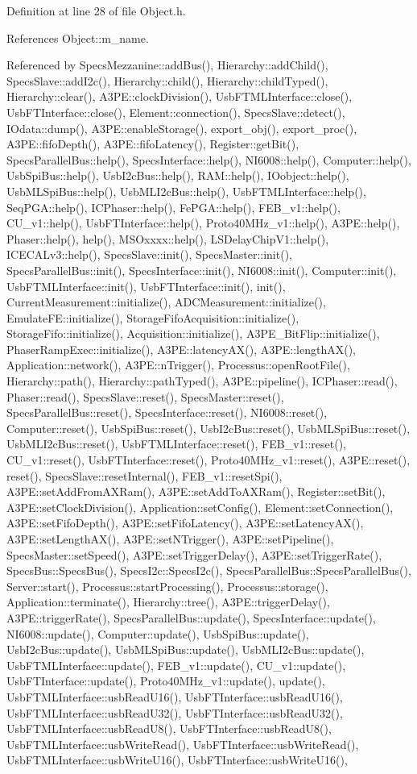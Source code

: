 Definition at line 28 of file Object.h.

References Object::m\_\-name.

Referenced by SpecsMezzanine::addBus(), Hierarchy::addChild(), SpecsSlave::addI2c(), Hierarchy::child(), Hierarchy::childTyped(), Hierarchy::clear(), A3PE::clockDivision(), UsbFTMLInterface::close(), UsbFTInterface::close(), Element::connection(), SpecsSlave::detect(), IOdata::dump(), A3PE::enableStorage(), export\_\-obj(), export\_\-proc(), A3PE::fifoDepth(), A3PE::fifoLatency(), Register::getBit(), SpecsParallelBus::help(), SpecsInterface::help(), NI6008::help(), Computer::help(), UsbSpiBus::help(), UsbI2cBus::help(), RAM::help(), IOobject::help(), UsbMLSpiBus::help(), UsbMLI2cBus::help(), UsbFTMLInterface::help(), SeqPGA::help(), ICPhaser::help(), FePGA::help(), FEB\_\-v1::help(), CU\_\-v1::help(), UsbFTInterface::help(), Proto40MHz\_\-v1::help(), A3PE::help(), Phaser::help(), help(), MSOxxxx::help(), LSDelayChipV1::help(), ICECALv3::help(), SpecsSlave::init(), SpecsMaster::init(), SpecsParallelBus::init(), SpecsInterface::init(), NI6008::init(), Computer::init(), UsbFTMLInterface::init(), UsbFTInterface::init(), init(), CurrentMeasurement::initialize(), ADCMeasurement::initialize(), EmulateFE::initialize(), StorageFifoAcquisition::initialize(), StorageFifo::initialize(), Acquisition::initialize(), A3PE\_\-BitFlip::initialize(), PhaserRampExec::initialize(), A3PE::latencyAX(), A3PE::lengthAX(), Application::network(), A3PE::nTrigger(), Processus::openRootFile(), Hierarchy::path(), Hierarchy::pathTyped(), A3PE::pipeline(), ICPhaser::read(), Phaser::read(), SpecsSlave::reset(), SpecsMaster::reset(), SpecsParallelBus::reset(), SpecsInterface::reset(), NI6008::reset(), Computer::reset(), UsbSpiBus::reset(), UsbI2cBus::reset(), UsbMLSpiBus::reset(), UsbMLI2cBus::reset(), UsbFTMLInterface::reset(), FEB\_\-v1::reset(), CU\_\-v1::reset(), UsbFTInterface::reset(), Proto40MHz\_\-v1::reset(), A3PE::reset(), reset(), SpecsSlave::resetInternal(), FEB\_\-v1::resetSpi(), A3PE::setAddFromAXRam(), A3PE::setAddToAXRam(), Register::setBit(), A3PE::setClockDivision(), Application::setConfig(), Element::setConnection(), A3PE::setFifoDepth(), A3PE::setFifoLatency(), A3PE::setLatencyAX(), A3PE::setLengthAX(), A3PE::setNTrigger(), A3PE::setPipeline(), SpecsMaster::setSpeed(), A3PE::setTriggerDelay(), A3PE::setTriggerRate(), SpecsBus::SpecsBus(), SpecsI2c::SpecsI2c(), SpecsParallelBus::SpecsParallelBus(), Server::start(), Processus::startProcessing(), Processus::storage(), Application::terminate(), Hierarchy::tree(), A3PE::triggerDelay(), A3PE::triggerRate(), SpecsParallelBus::update(), SpecsInterface::update(), NI6008::update(), Computer::update(), UsbSpiBus::update(), UsbI2cBus::update(), UsbMLSpiBus::update(), UsbMLI2cBus::update(), UsbFTMLInterface::update(), FEB\_\-v1::update(), CU\_\-v1::update(), UsbFTInterface::update(), Proto40MHz\_\-v1::update(), update(), UsbFTMLInterface::usbReadU16(), UsbFTInterface::usbReadU16(), UsbFTMLInterface::usbReadU32(), UsbFTInterface::usbReadU32(), UsbFTMLInterface::usbReadU8(), UsbFTInterface::usbReadU8(), UsbFTMLInterface::usbWriteRead(), UsbFTInterface::usbWriteRead(), UsbFTMLInterface::usbWriteU16(), UsbFTInterface::usbWriteU16(), 